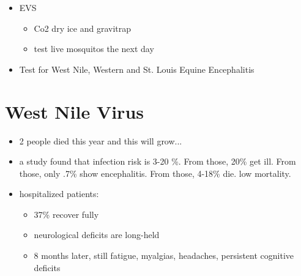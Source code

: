 \documentclass{article}
\begin{document}
\begin{itemize}
\begin{itemize}
\begin{itemize}
            \end{itemize}
            \item EVS
            \begin{itemize}
                \item Co2 dry ice and gravitrap
                \item test live mosquitos the next day
            \end{itemize}
            \item Test for West Nile, Western and St. Louis Equine Encephalitis
        \end{itemize}
    \end{itemize}

    \section{West Nile Virus}
    \begin{itemize}
        \item 2 people died this year and this will grow...
        \item a study found that infection risk is 3-20 \%.  From those, 20\% get ill.  From those, only .7\% show encephalitis.  From those, 4-18\% die.  low mortality.
        \item hospitalized patients:
        \begin{itemize}
            \item 37\% recover fully
            \item neurological deficits are long-held
            \item 8 months later, still fatigue, myalgias, headaches, persistent cognitive deficits
        \end{itemize}
    \end{itemize}
\end{document}

